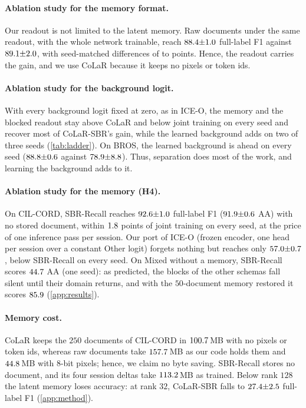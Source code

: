 \documentclass[10pt,twocolumn,letterpaper]{article}
\begin{document}
\paragraph{Ablation study for the memory format.} Our readout is not limited to the latent memory. Raw documents under the same readout, with the whole network trainable, reach $88.4{\pm}1.0$ full-label F1 against $89.1{\pm}2.0$, with seed-matched differences of \nErSbrDiffFullMin{} to \nErSbrDiffFullMax{} points. Hence, the readout carries the gain, and we use CoLaR because it keeps no pixels or token ids.

\paragraph{Ablation study for the background logit.} With every background logit fixed at zero, as in ICE-O, the memory and the blocked readout stay above CoLaR and below joint training on every seed and recover most of CoLaR-SBR's gain, while the learned background adds on two of three seeds (\cref{tab:ladder}). On BROS, the learned background is ahead on every seed ($88.8{\pm}0.6$ against $78.9{\pm}8.8$). Thus, separation does most of the work, and learning the background adds to it.

\paragraph{Ablation study for the memory (H4).} On CIL-CORD, SBR-Recall reaches $92.6{\pm}1.0$ full-label F1 ($91.9{\pm}0.6$ AA) with no stored document, within $1.8$ points of joint training on every seed, at the price of one inference pass per session. Our port of ICE-O (frozen encoder, one head per session over a constant Other logit) forgets nothing but reaches only $57.0{\pm}0.7$, below SBR-Recall on every seed. On Mixed without a memory, SBR-Recall scores $44.7$ AA (one seed): as predicted, the blocks of the other schemas fall silent until their domain returns, and with the $50$-document memory restored it scores $85.9$ (\cref{app:results}).

\paragraph{Memory cost.}\label{sec:cost} CoLaR keeps the $250$ documents of CIL-CORD in $100.7$\,MB with no pixels or token ids, whereas raw documents take $157.7$\,MB as our code holds them and $44.8$\,MB with 8-bit pixels; hence, we claim no byte saving. SBR-Recall stores no document, and its four session deltas take $113.2$\,MB as trained. Below rank $128$ the latent memory loses accuracy: at rank $32$, CoLaR-SBR falls to $27.4{\pm}2.5$ full-label F1 (\cref{app:method}).
\end{document}
